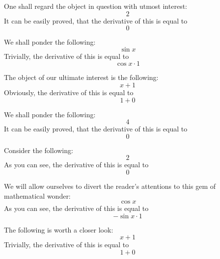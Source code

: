 \documentclass{article}
\begin{document}
One shall regard the object in question with utmost interest:
\begin{equation}
2 
\end{equation}
It can be easily proved, that the derivative of this is equal to
\begin{equation}
0 
\end{equation}

We shall ponder the following:
\begin{equation}
\sin x 
\end{equation}
Trivially, the derivative of this is equal to
\begin{equation}
\cos x \cdot 1 
\end{equation}

The object of our ultimate interest is the following:
\begin{equation}
x + 1 
\end{equation}
Obviously, the derivative of this is equal to
\begin{equation}
1 + 0 
\end{equation}

We shall ponder the following:
\begin{equation}
4 
\end{equation}
It can be easily proved, that the derivative of this is equal to
\begin{equation}
0 
\end{equation}

Consider the following:
\begin{equation}
2 
\end{equation}
As you can see, the derivative of this is equal to
\begin{equation}
0 
\end{equation}

We will allow ourselves to divert the reader's attentions to this gem of mathematical wonder:
\begin{equation}
\cos x 
\end{equation}
As you can see, the derivative of this is equal to
\begin{equation}
-\sin x \cdot 1 
\end{equation}

The following is worth a closer look:
\begin{equation}
x + 1 
\end{equation}
Trivially, the derivative of this is equal to
\begin{equation}
1 + 0 
\end{equation}
\end{document}

